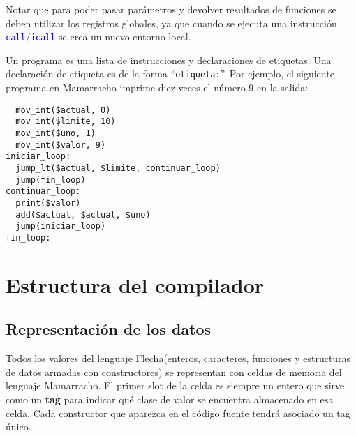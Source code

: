 \documentclass{article}
\newcommand{\flecha}{\textsf{Flecha}\xspace}
\newcommand{\mamarracho}{\textsf{Mamarracho}\xspace}
\newcommand{\instruction}[1]{\texttt{\textcolor{blue}{#1}}}
\begin{document}
\medskip
Notar que 
para poder pasar parámetros y devolver resultados de funciones
se deben utilizar los registros globales,
ya que cuando se ejecuta una instrucción
\instruction{call}/\instruction{icall}
se crea un nuevo entorno local.
\medskip

Un programa es una lista de instrucciones
y declaraciones de etiquetas. Una declaración de etiqueta es de la forma
``\texttt{etiqueta:}''. Por ejemplo, el siguiente programa en \mamarracho
imprime diez veces el número 9 en la salida:

\begin{verbatim}
  mov_int($actual, 0)
  mov_int($limite, 10)
  mov_int($uno, 1)
  mov_int($valor, 9)
iniciar_loop:
  jump_lt($actual, $limite, continuar_loop)
  jump(fin_loop)
continuar_loop:
  print($valor)
  add($actual, $actual, $uno)
  jump(iniciar_loop)
fin_loop:
\end{verbatim}

\section{Estructura del compilador}

\subsection{Representación de los datos}

Todos los valores del lenguaje \flecha (enteros, caracteres, funciones y
estructuras de datos armadas con constructores)
se representan con celdas de memoria del lenguaje \mamarracho.
El primer slot de la celda es siempre un entero
que sirve como un {\bf tag} para indicar qué clase de valor se encuentra
almacenado en esa celda.  Cada constructor que aparezca en el código
fuente tendrá asociado un tag único.
\end{document}
